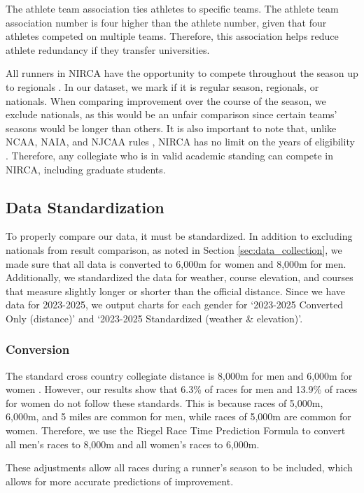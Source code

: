 \documentclass[suppldata]{interact}
\theoremstyle{plain}%
\theoremstyle{definition}
\theoremstyle{remark}
\begin{document}
The athlete team association ties athletes to specific teams. The athlete team association number is four higher than the athlete number, given that four athletes competed on multiple teams. Therefore, this association helps reduce athlete redundancy if they transfer universities.

All runners in NIRCA have the opportunity to compete throughout the season up to regionals \cite{nirca}. In our dataset, we mark if it is regular season, regionals, or nationals. When comparing improvement over the course of the season, we exclude nationals, as this would be an unfair comparison since certain teams' seasons would be longer than others. It is also important to note that, unlike NCAA, NAIA, and NJCAA rules \cite{bakker2005ncaa}, NIRCA has no limit on the years of eligibility \cite{nirca}. Therefore, any collegiate who is in valid academic standing can compete in NIRCA, including graduate students.


\subsection{Data Standardization}
\label{sec:data_standardization}
To properly compare our data, it must be standardized. In addition to excluding nationals from result comparison, as noted in Section \ref{sec:data_collection}, we made sure that all data is converted to 6,000m for women and 8,000m for men. Additionally, we standardized the data for weather, course elevation, and courses that measure slightly longer or shorter than the official distance. Since we have data for 2023-2025, we output charts for each gender for `2023-2025 Converted Only (distance)' and `2023-2025 Standardized (weather \& elevation)'.

\subsubsection{Conversion}
\label{sec:conversion}
The standard cross country collegiate distance is 8,000m for men and 6,000m for women \cite{nirca}. However, our results show that 6.3\% of races for men and 13.9\% of races for women do not follow these standards. This is because races of 5,000m, 6,000m, and 5 miles are common for men, while races of 5,000m are common for women. Therefore, we use the Riegel Race Time Prediction Formula \cite{riegel1981athletic} to convert all men's races to 8,000m and all women's races to 6,000m.

 These adjustments allow all races during a runner's season to be included, which allows for more accurate predictions of improvement.
\end{document}
